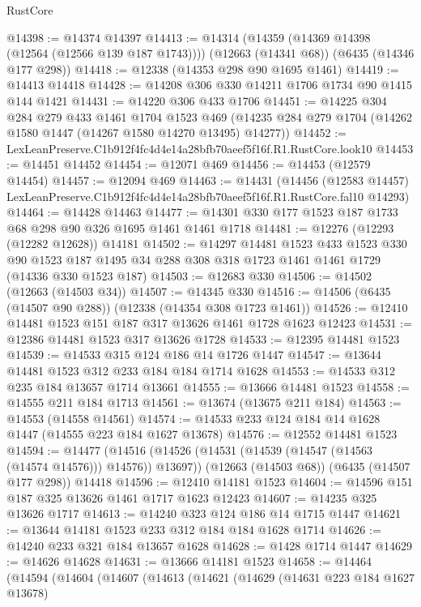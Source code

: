 \begin{lexlean}{RustCore}
\begin{coremodule}
@14398 := @14374 @14397
@14413 := @14314
    (@14359 (@14369 @14398 (@12564 (@12566 @139 @187 @1743))))
    (@12663 (@14341 @68))
    (@6435 (@14346 @177 @298))
@14418 := @12338 (@14353 @298 @90 @1695 @1461)
@14419 := @14413 @14418
@14428 := @14208 @306 @330 @14211 @1706 @1734 @90 @1415 @144 @1421
@14431 := @14220 @306 @433 @1706
@14451 := @14225
    @304
    @284
    @279
    @433
    @1461
    @1704
    @1523
    @469
    (@14235 @284 @279 @1704 (@14262 @1580 @1447 (@14267 @1580 @14270 @13495) @14277))
@14452 := LexLeanPreserve.C1b912f4fc4d4e14a28bfb70aeef5f16f.R1.RustCore.look10
@14453 := @14451 @14452
@14454 := @12071 @469
@14456 := @14453 (@12579 @14454)
@14457 := @12094 @469
@14463 := @14431
    (@14456
      (@12583 @14457)
      LexLeanPreserve.C1b912f4fc4d4e14a28bfb70aeef5f16f.R1.RustCore.fal10
      @14293)
@14464 := @14428 @14463
@14477 := @14301 @330 @177 @1523 @187 @1733 @68 @298 @90 @326 @1695 @1461 @1461 @1718
@14481 := @12276 (@12293 (@12282 @12628)) @14181
@14502 := @14297
    @14481
    @1523
    @433
    @1523
    @330
    @90
    @1523
    @187
    @1495
    @34
    @288
    @308
    @318
    @1723
    @1461
    @1461
    @1729
    (@14336 @330 @1523 @187)
@14503 := @12683 @330
@14506 := @14502 (@12663 (@14503 @34))
@14507 := @14345 @330
@14516 := @14506 (@6435 (@14507 @90 @288)) (@12338 (@14354 @308 @1723 @1461))
@14526 := @12410 @14481 @1523 @151 @187 @317 @13626 @1461 @1728 @1623 @12423
@14531 := @12386 @14481 @1523 @317 @13626 @1728
@14533 := @12395 @14481 @1523
@14539 := @14533 @315 @124 @186 @14 @1726 @1447
@14547 := @13644 @14481 @1523 @312 @233 @184 @184 @1714 @1628
@14553 := @14533 @312 @235 @184 @13657 @1714 @13661
@14555 := @13666 @14481 @1523
@14558 := @14555 @211 @184 @1713
@14561 := @13674 (@13675 @211 @184)
@14563 := @14553 (@14558 @14561)
@14574 := @14533 @233 @124 @184 @14 @1628 @1447 (@14555 @223 @184 @1627 @13678)
@14576 := @12552 @14481 @1523
@14594 := @14477
    (@14516 (@14526 (@14531 (@14539 (@14547 (@14563 (@14574 @14576))) @14576)) @13697))
    (@12663 (@14503 @68))
    (@6435 (@14507 @177 @298))
    @14418
@14596 := @12410 @14181 @1523
@14604 := @14596 @151 @187 @325 @13626 @1461 @1717 @1623 @12423
@14607 := @14235 @325 @13626 @1717
@14613 := @14240 @323 @124 @186 @14 @1715 @1447
@14621 := @13644 @14181 @1523 @233 @312 @184 @184 @1628 @1714
@14626 := @14240 @233 @321 @184 @13657 @1628
@14628 := @1428 @1714 @1447
@14629 := @14626 @14628
@14631 := @13666 @14181 @1523
@14658 := @14464
    (@14594
      (@14604
        (@14607
          (@14613
            (@14621
              (@14629
                (@14631 @223 @184 @1627 @13678)

\end{coremodule}
\end{lexlean}
